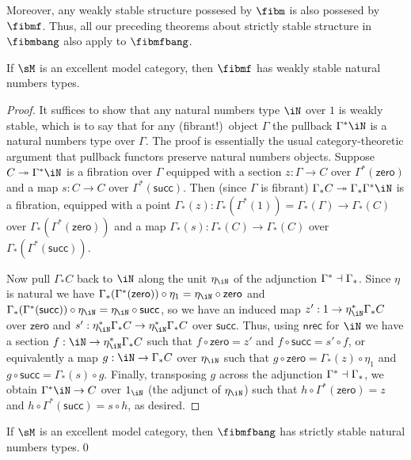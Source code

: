 \documentclass[referee]{psp}
\let\N\iN
\def\zero{\mathsf{zero}}
\def\succ{\mathsf{succ}}
\def\nrec{\mathsf{nrec}}
\begin{document}
Moreover, any weakly stable structure possesed by $\fibm$ is also possesed by $\fibmf$.
Thus, all our preceding theorems about strictly stable structure in $\fibmbang$ also apply to $\fibmfbang$.

\begin{thm}\label{thm:nat-stable}
  If $\sM$ is an excellent model category, then $\fibmf$ has weakly stable natural numbers types.
\end{thm}
\begin{proof}
  It suffices to show that any natural numbers type $\N$ over $1$ is weakly stable, which is to say that for any (fibrant!)\ object $\Gamma$ the pullback $\Gamma^* \N$ is a natural numbers type over $\Gamma$.
  The proof is essentially the usual category-theoretic argument that pullback functors preserve natural numbers objects.
  Suppose $C\fib \Gamma^* \N$ is a fibration over $\Gamma$ equipped with a section $z:\Gamma\to C$ over $\Gamma^*(\zero)$ and a map $s:C\to C$ over $\Gamma^*(\succ)$.
  Then (since $\Gamma$ is fibrant) $\Gamma_* C \fib \Gamma_* \Gamma^* \N$ is a fibration, equipped with a point $\Gamma_*(z) : \Gamma_*(\Gamma^*(1)) = \Gamma_*(\Gamma) \to \Gamma_*(C)$ over $\Gamma_*(\Gamma^*(\zero))$ and a map $\Gamma_*(s):\Gamma_*(C)\to\Gamma_*(C)$ over $\Gamma_*(\Gamma^*(\succ))$.

  Now pull $\Gamma_* C$ back to $\N$ along the unit $\eta_\N$ of the adjunction $\Gamma^* \dashv \Gamma_*$.
  Since $\eta$ is natural we have $\Gamma_*(\Gamma^*(\zero)) \circ \eta_1 = \eta_\N \circ \zero$ and $\Gamma_*(\Gamma^*(\succ)) \circ \eta_\N = \eta_\N \circ \succ$, so we have an induced map $z' : 1 \to \eta_\N^*\Gamma_*C$ over $\zero$ and $s':\eta_\N^*\Gamma_*C \to \eta_\N^*\Gamma_*C$ over $\succ$.
  Thus, using $\nrec$ for $\N$ we have a section $f:\N\to \eta_\N^*\Gamma_* C$ such that $f \circ \zero = z'$ and $f\circ \succ = s' \circ f$, or equivalently a map $g:\N \to \Gamma_*C$ over $\eta_\N$ such that $g\circ \zero = \Gamma_*(z) \circ \eta_1$ and $g\circ \succ = \Gamma_*(s) \circ g$.
  Finally, transposing $g$ across the adjunction $\Gamma^* \dashv \Gamma_*$, we obtain $\Gamma^* \N \to C$ over $1_\N$ (the adjunct of $\eta_\N$) such that $h\circ \Gamma^*(\zero) = z$ and $h\circ \Gamma^*(\succ) = s\circ h$, as desired.
\end{proof}

\begin{cor}
  If $\sM$ is an excellent model category, then $\fibmfbang$ has strictly stable natural numbers types.\qed
\end{cor}
\end{document}
